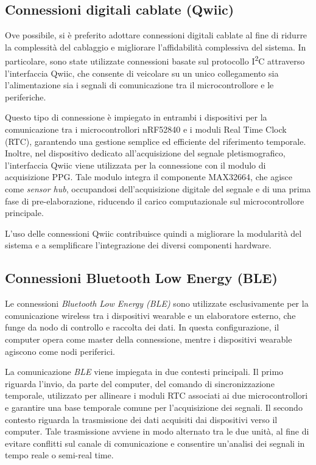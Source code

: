 \documentclass[11pt,a4paper]{article}
\begin{document}
\subsection{Connessioni digitali cablate (Qwiic)}
Ove possibile, si è preferito adottare connessioni digitali cablate al fine di ridurre la complessità del cablaggio e migliorare l’affidabilità complessiva del sistema. In particolare, sono state utilizzate connessioni basate sul protocollo I\textsuperscript{2}C attraverso l’interfaccia Qwiic, che consente di veicolare su un unico collegamento sia l’alimentazione sia i segnali di comunicazione tra il microcontrollore e le periferiche.

Questo tipo di connessione è impiegato in entrambi i dispositivi per la comunicazione tra i microcontrollori nRF52840 e i moduli Real Time Clock (RTC), garantendo una gestione semplice ed efficiente del riferimento temporale. Inoltre, nel dispositivo dedicato all’acquisizione del segnale pletismografico, l’interfaccia Qwiic viene utilizzata per la connessione con il modulo di acquisizione PPG. Tale modulo integra il componente MAX32664, che agisce come \emph{sensor hub}, occupandosi dell’acquisizione digitale del segnale e di una prima fase di pre-elaborazione, riducendo il carico computazionale sul microcontrollore principale.

L’uso delle connessioni Qwiic contribuisce quindi a migliorare la modularità del sistema e a semplificare l’integrazione dei diversi componenti hardware.

\subsection{Connessioni Bluetooth Low Energy (BLE)}
Le connessioni \textit{Bluetooth Low Energy (BLE)} sono utilizzate esclusivamente per la comunicazione wireless tra i dispositivi wearable e un elaboratore esterno, che funge da nodo di controllo e raccolta dei dati. In questa configurazione, il computer opera come master della connessione, mentre i dispositivi wearable agiscono come nodi periferici.

La comunicazione \textit{BLE} viene impiegata in due contesti principali. Il primo riguarda l’invio, da parte del computer, del comando di sincronizzazione temporale, utilizzato per allineare i moduli RTC associati ai due microcontrollori e garantire una base temporale comune per l’acquisizione dei segnali. Il secondo contesto riguarda la trasmissione dei dati acquisiti dai dispositivi verso il computer. Tale trasmissione avviene in modo alternato tra le due unità, al fine di evitare conflitti sul canale di comunicazione e consentire un’analisi dei segnali in tempo reale o semi-real time.
\end{document}

